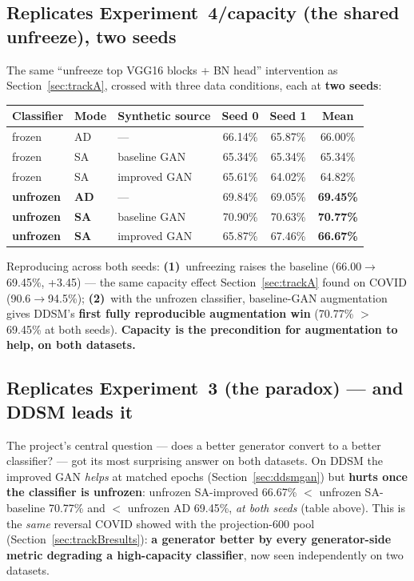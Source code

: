 \documentclass[11pt]{article}
\begin{document}
\subsection{Replicates Experiment~4/capacity (the shared unfreeze), two seeds}
\label{sec:ddsmcap}
The same ``unfreeze top VGG16 blocks + BN head'' intervention as
Section~\ref{sec:trackA}, crossed with three data conditions, each at \textbf{two
seeds}:

\begin{table}[htbp]
\centering\small
\begin{tabular}{@{}lllccc@{}}
\toprule
\textbf{Classifier} & \textbf{Mode} & \textbf{Synthetic source} & \textbf{Seed 0} & \textbf{Seed 1} & \textbf{Mean} \\
\midrule
frozen   & AD & ---          & 66.14\% & 65.87\% & 66.00\% \\
frozen   & SA & baseline GAN & 65.34\% & 65.34\% & 65.34\% \\
frozen   & SA & improved GAN & 65.61\% & 64.02\% & 64.82\% \\
\textbf{unfrozen} & \textbf{AD} & ---          & 69.84\% & 69.05\% & \textbf{69.45\%} \\
\textbf{unfrozen} & \textbf{SA} & baseline GAN & 70.90\% & 70.63\% & \textbf{70.77\%} \\
\textbf{unfrozen} & \textbf{SA} & improved GAN & 65.87\% & 67.46\% & \textbf{66.67\%} \\
\bottomrule
\end{tabular}
\end{table}

\noindent Reproducing across both seeds: \textbf{(1)}~unfreezing raises the baseline
(66.00$\to$69.45\%, +3.45) --- the same capacity effect Section~\ref{sec:trackA} found
on COVID (90.6$\to$94.5\%); \textbf{(2)}~with the unfrozen classifier, baseline-GAN
augmentation gives DDSM's \textbf{first fully reproducible augmentation win}
(70.77\% $>$ 69.45\% at both seeds). \textbf{Capacity is the precondition for
augmentation to help, on both datasets.}

\subsection{Replicates Experiment~3 (the paradox) --- and DDSM leads it}
\label{sec:ddsmreversal}
The project's central question --- does a better generator convert to a better
classifier? --- got its most surprising answer on both datasets. On DDSM the improved
GAN \emph{helps} at matched epochs (Section~\ref{sec:ddsmgan}) but \textbf{hurts once
the classifier is unfrozen}: unfrozen SA-improved 66.67\% $<$ unfrozen SA-baseline
70.77\% and $<$ unfrozen AD 69.45\%, \emph{at both seeds} (table above). This is the
\emph{same} reversal COVID showed with the projection-600 pool
(Section~\ref{sec:trackBresults}): \textbf{a generator better by every generator-side
metric degrading a high-capacity classifier}, now seen independently on two datasets.
\end{document}
